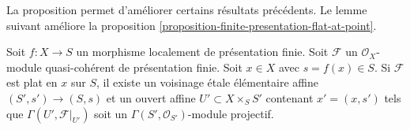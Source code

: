 \noindent
La proposition permet d'améliorer certains résultats précédents.
Le lemme suivant améliore la
proposition \ref{proposition-finite-presentation-flat-at-point}.

\begin{lemma}
\label{lemma-flat-finite-presentation-affine-neighbourhood-projective}
Soit $f : X \to S$ un morphisme localement de présentation finie.
Soit $\mathcal{F}$ un $\mathcal{O}_X$-module quasi-cohérent
de présentation finie. Soit $x \in X$ avec $s = f(x) \in S$.
Si $\mathcal{F}$ est plat en $x$ sur $S$, il existe un voisinage
\'etale élémentaire affine $(S', s') \to (S, s)$ et
un ouvert affine $U' \subset X \times_S S'$ contenant $x' = (x, s')$
tels que $\Gamma(U', \mathcal{F}|_{U'})$ soit un
$\Gamma(S', \mathcal{O}_{S'})$-module projectif.
\end{lemma}

